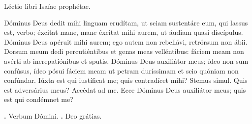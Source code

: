 
Léctio libri Isaíae prophétae.

Dóminus Deus dedit mihi linguam erudítam, ut sciam sustentáre eum, qui lassus est, verbo; éxcitat mane, mane éxcitat mihi aurem, ut áudiam quasi discípulus. Dóminus Deus apéruit mihi aurem; ego autem non rebellávi, retrórsum non ábii. Dorsum meum dedi percutiéntibus et genas meas velléntibus: fáciem meam non avérti ab increpatiónibus et sputis. Dóminus Deus auxiliátor meus; ídeo non sum confúsus, ídeo pósui fáciem meam ut petram duríssimam et scio quóniam non confúndar. Iúxta est qui iustíficat me; quis contradícet mihi? Stemus simul. Quis est adversárius meus? Accédat ad me. Ecce Dóminus Deus auxiliátor meus; quis est qui condémnet me?

\textbf{\Vbar.} Verbum Dómini.
\textbf{\Rbar.} Deo grátias.
\par